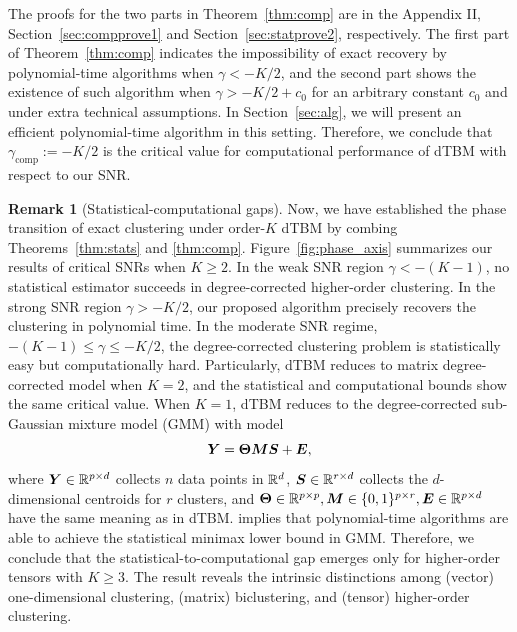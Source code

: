 \documentclass[journal]{IEEEtran}
\theoremstyle{definition}
\theoremstyle{definition}
\newtheorem{rmk}{Remark}
\begin{document}
The proofs for the two parts in Theorem~\ref{thm:comp} are in the Appendix II, Section~\ref{sec:compprove1} and Section~\ref{sec:statprove2}, respectively. The first part of Theorem~\ref{thm:comp} indicates the impossibility of exact recovery by polynomial-time algorithms when $\gamma < -K/2$, and the second part shows the existence of such algorithm when {$\gamma > -K/2+c_0$  for an arbitrary constant $c_0$ and} under extra technical assumptions. In Section~\ref{sec:alg}, we will present an efficient polynomial-time algorithm in this setting. Therefore, we conclude that $\gamma_{\text{comp}}:=-K/2$ is the critical value for computational performance of dTBM with respect to our SNR. 

\begin{rmk}[Statistical-computational gaps]
Now, we have established the phase transition of exact clustering under order-$K$ dTBM by combing Theorems~\ref{thm:stats} and \ref{thm:comp}. Figure~\ref{fig:phase_axis} summarizes our results of critical SNRs when $K \geq 2$. In the weak SNR region $\gamma < -(K-1)$, no statistical estimator succeeds in degree-corrected higher-order clustering. In the strong SNR region $\gamma  > -K/2$, our proposed algorithm precisely recovers the clustering in polynomial time. In the moderate SNR regime, $-(K-1)\leq \gamma \leq -K/2$, the degree-corrected clustering problem is statistically easy but computationally hard. Particularly, dTBM reduces to matrix degree-corrected model when $K =2$, and the statistical and computational bounds show the same critical value. When $K =1$, dTBM reduces to the degree-corrected sub-Gaussian mixture model (GMM) with model
\begin{equation}
    \bm Y = \boldsymbol{\Theta} \bm M \bm S + \bm{E},
\end{equation}
where $\bm Y \in \mathbb{R}^{p \times d}$ collects $n$ data points in $\mathbb{R}^d$, $\bm S \in \mathbb{R}^{r \times d}$ collects the $d$-dimensional centroids for $r$ clusters, and $\boldsymbol{\Theta} \in \mathbb{R}^{p \times p}, \bm M \in \{0,1\}^{p \times r}, \bm{E} \in \mathbb{R}^{p \times d}$ have the same meaning as in dTBM. \cite{lu2016statistical} implies that polynomial-time algorithms are able to achieve the statistical minimax lower bound in GMM. Therefore, we conclude that the statistical-to-computational gap emerges only for higher-order tensors with $K \geq 3$. The result reveals the intrinsic distinctions among (vector) one-dimensional clustering, (matrix) biclustering, and (tensor) higher-order clustering. 
\end{rmk}
\end{document}

